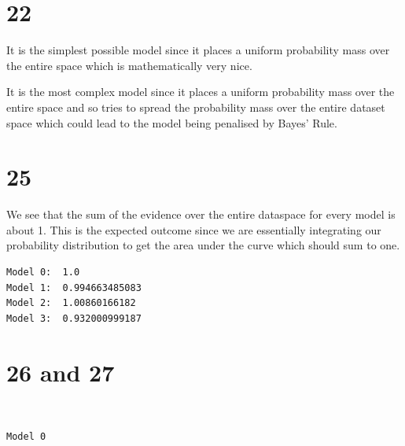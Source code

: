 \documentclass[11pt]{article}
\begin{document}
    \section*{22}\label{section}

It is the simplest possible model since it places a uniform probability
mass over the entire space which is mathematically very nice.

It is the most complex model since it places a uniform probability mass
over the entire space and so tries to spread the probability mass over
the entire dataset space which could lead to the model being penalised
by Bayes' Rule.

    \section*{25}\label{section}

We see that the sum of the evidence over the entire dataspace for every
model is about 1. This is the expected outcome since we are essentially
integrating our probability distribution to get the area under the curve
which should sum to one.


    \begin{Verbatim}[commandchars=\\\{\}]
Model 0:  1.0
Model 1:  0.994663485083
Model 2:  1.00860166182
Model 3:  0.932000999187

    \end{Verbatim}

    \section*{26 and 27}\label{and-27}


    \begin{center}
    \end{center}
    { \hspace*{\fill} \\}
    
    \begin{Verbatim}[commandchars=\\\{\}]
Model 0

    \end{Verbatim}

    \begin{center}
    \end{center}
    { \hspace*{\fill} \\}
    
\end{document}

